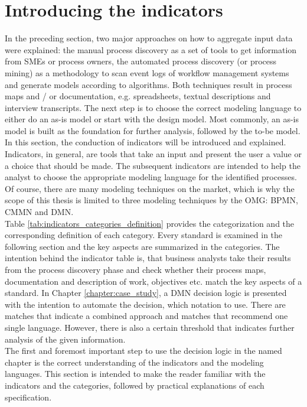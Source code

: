 \section{Introducing the indicators}
\label{section:indicator_introduction}
In the preceding section, two major approaches on how to aggregate input data were explained: the manual process discovery as a set of tools to get information from SMEs or process owners, the automated process discovery (or process mining) as a methodology to scan event logs of workflow management systems and generate models according to algorithms. Both techniques result in process maps and / or documentation, e.g. spreadsheets, textual descriptions and interview transcripts. The next step is to choose the correct modeling language to either do an as-is model or start with the design model. Most commonly, an as-is model is built as the foundation for further analysis, followed by the to-be model. \\
In this section, the conduction of indicators will be introduced and explained. Indicators, in general, are tools that take an input and present the user a value or a choice that should be made. The subsequent indicators are intended to help the analyst to choose the appropriate modeling language for the identified processes. Of course, there are many modeling techniques on the market, which is why the scope of this thesis is limited to three modeling techniques by the \ac{OMG}: BPMN, CMMN and DMN. 
\\
Table \ref{tab:indicators_categories_definition} provides the categorization and the corresponding definition of each category. Every standard is examined in the following section and the key aspects are summarized in the categories. 
The intention behind the indicator table is, that business analysts take their results from the process discovery phase and check whether their process maps, documentation and description of work, objectives etc. match the key aspects of a standard. In Chapter \ref{chapter:case_study}, a DMN decision logic is presented with the intention to automate the decision, which notation to use. There are matches that indicate a combined approach and matches that recommend one single language. However, there is also a certain threshold that indicates further analysis of the given information. \\
The first and foremost important step to use the decision logic in the named chapter is the correct understanding of the indicators and the modeling languages. This section is intended to make the reader familiar with the indicators and the categories, followed by practical explanations of each specification. 


